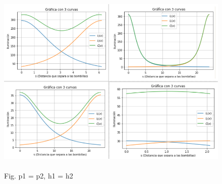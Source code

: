 \documentclass[11pt]{article}
\begin{document}
\begin{figure}[!h]
	
	\includegraphics[keepaspectratio, width=15cm]{Imagenes/whatIf.png}
	\caption{\\Fig. p1 = p2, h1 = h2 \label{fig:grafica2}}
\end{figure}
\newpage
\vspace{0.5cm}
\end{document}
